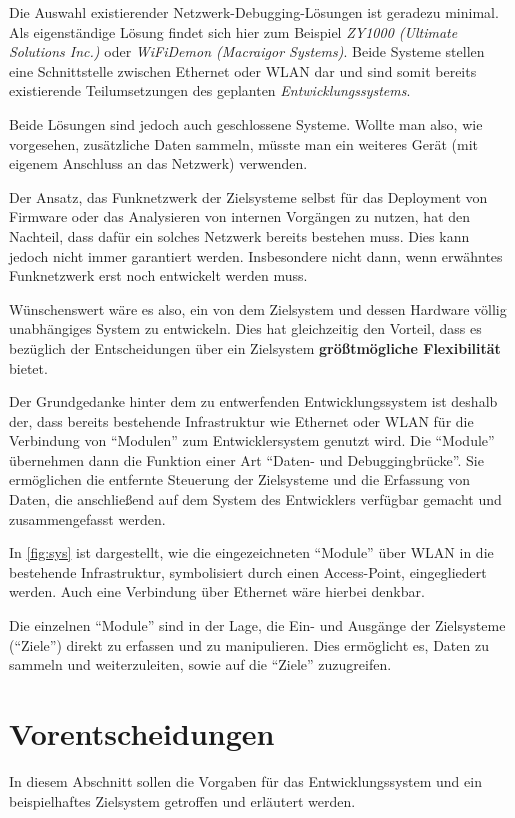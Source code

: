 Die Auswahl existierender Netzwerk-Debugging-Lösungen ist geradezu
minimal. Als eigenständige Lösung findet sich hier zum Beispiel \emph{ZY1000
(Ultimate Solutions Inc.)}\cite{ULT} oder \emph{WiFiDemon (Macraigor
Systems)}\cite{MAC}. Beide Systeme stellen eine Schnittstelle zwischen Ethernet
oder WLAN dar und sind somit bereits existierende Teilumsetzungen des geplanten
\emph{Entwicklungssystems}.

Beide Lösungen sind jedoch auch geschlossene Systeme. Wollte man also, wie
vorgesehen, zusätzliche Daten sammeln, müsste man ein weiteres Gerät (mit
eigenem Anschluss an das Netzwerk) verwenden.

Der Ansatz, das Funknetzwerk der Zielsysteme selbst für das Deployment von
Firmware oder das Analysieren von internen Vorgängen zu nutzen, hat den
Nachteil, dass dafür ein solches Netzwerk bereits bestehen muss.
Dies kann jedoch nicht immer garantiert werden. Insbesondere nicht dann, wenn
erwähntes Funknetzwerk erst noch entwickelt werden muss.

Wünschenswert wäre es also, ein von dem Zielsystem und dessen Hardware völlig
unabhängiges System zu entwickeln. Dies hat gleichzeitig den Vorteil, dass es
bezüglich der Entscheidungen über ein Zielsystem \textbf{größtmögliche
Flexibilität} bietet.

Der Grundgedanke hinter dem zu entwerfenden Entwicklungssystem ist
deshalb der, dass bereits bestehende Infrastruktur wie Ethernet oder WLAN für
die Verbindung von "`Modulen"' zum Entwicklersystem genutzt wird. Die
"`Module"' übernehmen dann die Funktion einer Art "`Daten- und
Debuggingbrücke"'. Sie ermöglichen die entfernte Steuerung der Zielsysteme
und die Erfassung von Daten, die anschließend auf dem System des Entwicklers
verfügbar gemacht und zusammengefasst werden.

In \autoref{fig:sys} ist dargestellt, wie die eingezeichneten "`Module"'
über WLAN in die bestehende Infrastruktur, symbolisiert durch einen
Access-Point, eingegliedert werden. Auch eine Verbindung über Ethernet wäre
hierbei denkbar.

Die einzelnen "`Module"' sind in der Lage, die Ein- und Ausgänge
der Zielsysteme ("`Ziele"') direkt zu erfassen und zu manipulieren. Dies
ermöglicht es, Daten zu sammeln und weiterzuleiten, sowie auf die "`Ziele"'
zuzugreifen.
\section{Vorentscheidungen}
In diesem Abschnitt sollen die Vorgaben für das Entwicklungssystem und ein
beispielhaftes Zielsystem getroffen und erläutert werden.
